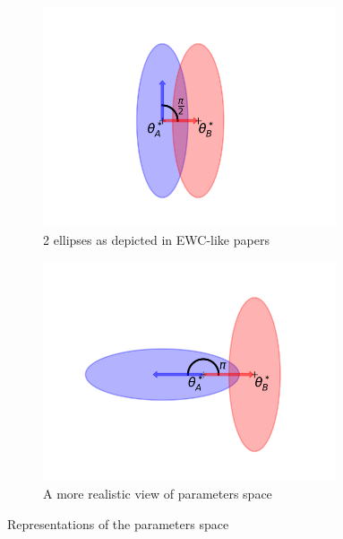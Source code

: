 \documentclass[11pt]{article}
\begin{document}
\begin{figure}
    \begin{subfigure}[b]{0.25\textwidth}
        \centering
        \includegraphics[width=0.95\textwidth]{images/ellipse_overlap_90.png}
        \caption{2 ellipses as depicted in EWC-like papers}
        \label{fig:two_ellipses_90}
    \end{subfigure}
    \hspace{-8mm}
    \begin{subfigure}[b]{0.25\textwidth}
        \centering
        \includegraphics[width=0.95\textwidth]{images/ellipse_overlap_180.png}
        \caption{A more realistic view of parameters space}
        \label{fig:two_ellipses_180}
    \end{subfigure}
    \caption{Representations of the parameters space}
\end{figure}
\end{document}
